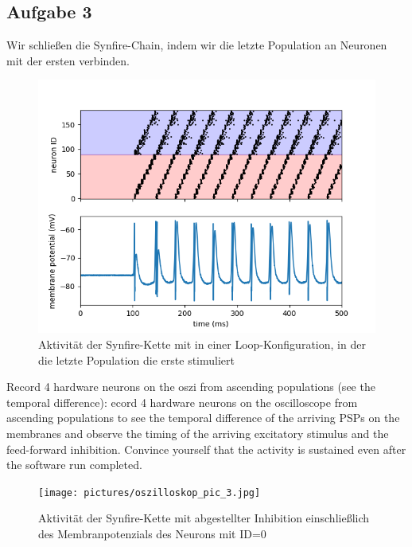 \documentclass[10pt,a4paper]{scrartcl}
\begin{document}
\subsection{Aufgabe 3}
Wir schließen die Synfire-Chain, indem wir die letzte Population an Neuronen mit der ersten verbinden.
\begin{figure} [ht]
\begin{center}
\label{fig:abb4}
\caption{Aktivität der Synfire-Kette mit in einer Loop-Konfiguration, in der die letzte Population die erste stimuliert}
\includegraphics[scale=0.35]{pictures/synfire_chain_loop.png}
\end{center}
\end{figure}

Record 4 hardware neurons on the oszi from ascending populations (see the temporal difference):
ecord 4 hardware neurons on the oscilloscope from ascending populations to see the
temporal difference of the arriving PSPs on the membranes and observe the timing of
the arriving excitatory stimulus and the feed-forward inhibition. Convince yourself that
the activity is sustained even after the software run completed.


\begin{figure} [ht]
\begin{center}
\label{fig:abb4}
\caption{Aktivität der Synfire-Kette mit abgestellter Inhibition einschließlich des Membranpotenzials des Neurons mit ID=0}
\texttt{[image: pictures/oszilloskop\_pic\_3.jpg]}
\end{center}
\end{figure}

\newpage
\end{document}
